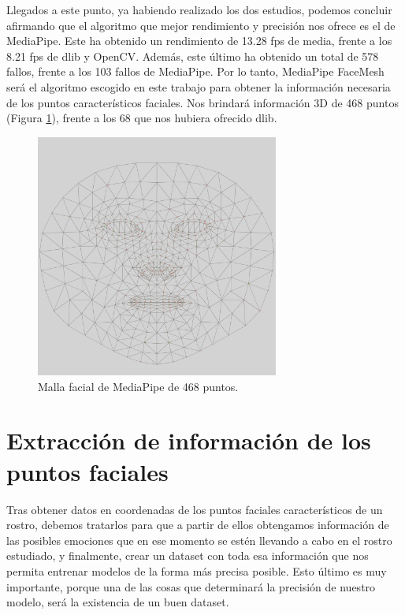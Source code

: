 Llegados a este punto, ya habiendo realizado los dos estudios, podemos concluir afirmando que el algoritmo que mejor rendimiento y precisión nos ofrece es el de MediaPipe. Este ha obtenido un rendimiento de 13.28 fps de media, frente a los 8.21 fps de dlib y OpenCV. Además, este último ha obtenido un total de 578 fallos, frente a los 103 fallos de MediaPipe. Por lo tanto, MediaPipe FaceMesh será el algoritmo escogido en este trabajo para obtener la información necesaria de los puntos característicos faciales. Nos brindará información 3D de 468 puntos (Figura \ref{fig:mediapipe_malla}), frente a los 68 que nos hubiera ofrecido dlib.\\

\begin{figure} [h!]
  \begin{center}
    \includegraphics[width=8cm]{figs/canonical_face_model_uv_visualization.png}
  \end{center}
  \captionsetup{justification=centering}
  \caption{Malla facial de MediaPipe de 468 puntos.}
  \label{fig:mediapipe_malla}
\end{figure}

\section{Extracción de información de los puntos faciales}
\label{sec:extraer_informacion}

Tras obtener datos en coordenadas de los puntos faciales característicos de un rostro, debemos tratarlos para que a partir de ellos obtengamos información de las posibles emociones que en ese momento se estén llevando a cabo en el rostro estudiado, y finalmente, crear un dataset con toda esa información que nos permita entrenar modelos de la forma más precisa posible. Esto último es muy importante, porque una de las cosas que determinará la precisión de nuestro modelo, será la existencia de un buen dataset.\\

